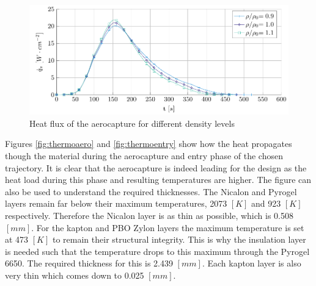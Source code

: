 \begin{figure}[h]
	\centering
	\includegraphics{./Figure/Thermal/heatfluxes.pdf}
	\caption{Heat flux of the aerocapture for different density levels}
	\label{fig:heatfluxes}
\end{figure}

Figures \ref{fig:thermoaero} and \ref{fig:thermoentry} show how the heat propagates though the material during the aerocapture and entry phase of the chosen trajectory. It is clear that the aerocapture is indeed leading for the design as the heat load during this phase and resulting temperatures are higher. The figure can also be used to understand the required thicknesses. The Nicalon and Pyrogel layers remain far below their maximum temperatures, 2073 $\left[K\right]$ and 923 $\left[K\right]$ respectively. Therefore the Nicalon layer is as thin as possible, which is 0.508 $\left[mm\right]$. For the kapton and PBO Zylon layers the maximum temperature is set at 473 $\left[K\right]$ to remain their structural integrity. This is why the insulation layer is needed such that the temperature drops to this maximum through the Pyrogel 6650. The required thickness for this is 2.439 $\left[mm\right]$. Each kapton layer is also very thin which comes down to 0.025 $\left[mm\right]$.

